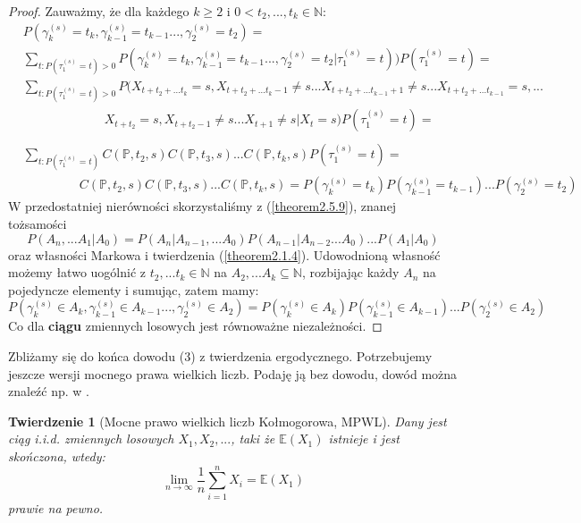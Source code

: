 \documentclass[a4paper]{article}
\theoremstyle{defn}
\theoremstyle{theorem}
\newtheorem{theorem}[defn]{Twierdzenie}
\theoremstyle{lemma}
\theoremstyle{cor}
\theoremstyle{fact}
\begin{document}
\begin{proof}
Zauważmy, że dla każdego $k \geq 2$ i $0 < t_2,...,t_k \in \mathbb{N}$:
\begin{align*}
    &P(\gamma_k^{(s)} = t_k, \gamma_{k-1}^{(s)} = t_{k-1} ..., \gamma_2^{(s)} = t_2) =\\
    &\sum\limits_{t: P(\tau_1^{(s)} = t) > 0} P(\gamma_k^{(s)} =t_k, \gamma_{k-1}^{(s)} = t_{k-1} ..., \gamma_2^{(s)} = t_2 | \tau_1^{(s)} = t))P(\tau_1^{(s)} = t) =\\
    &\sum\limits_{t: P(\tau_1^{(s)} = t) > 0} P(X_{t+t_2+...t_k} = s, X_{t+t_2+...t_k - 1} \neq s ... X_{t+t_2+...t_{k-1} + 1} \neq s ... X_{t+t_2+...t_{k-1}} = s, ...\\
    &\quad\quad\quad\quad\quad\quad\,\,\, X_{t+t_2} = s, X_{t+t_2 - 1} \neq s ... X_{t+1} \neq s|X_t = s)P(\tau_1^{(s)} = t) = \\\\
    &\sum\limits_{t: P(\tau_1^{(s)} = t)} C(\mathbb{P}, t_2, s)C(\mathbb{P}, t_3, s)...C(\mathbb{P}, t_k, s)P(\tau_1^{(s)} = t) =\\
    &\quad\quad\quad\quad\,\,\, C(\mathbb{P}, t_2, s)C(\mathbb{P}, t_3, s)...C(\mathbb{P}, t_k, s) = P(\gamma_k^{(s)} = t_k) P(\gamma_{k-1}^{(s)} = t_{k-1}) ...P(\gamma_2^{(s)} = t_2)
\end{align*}
W przedostatniej nierówności skorzystaliśmy z (\ref{theorem2.5.9}), znanej tożsamości
$$P(A_n, ... A_1|A_0) = P(A_n|A_{n-1}, ...A_0)P(A_{n-1}|A_{n-2}...A_0)...P(A_1|A_0)$$
oraz własności Markowa i twierdzenia (\ref{theorem2.1.4}). Udowodnioną własność możemy łatwo uogólnić z $t_2, ... t_k \in \mathbb{N}$ na $A_2, ... A_k \subseteq \mathbb{N}$, rozbijając każdy $A_n$ na pojedyncze elementy i sumując, zatem mamy:
$$P(\gamma_k^{(s)} \in A_k, \gamma_{k-1}^{(s)} \in A_{k-1} ..., \gamma_2^{(s)} \in A_2) = P(\gamma_k^{(s)} \in A_k) P(\gamma_{k-1}^{(s)} \in A_{k-1}) ...P(\gamma_2^{(s)} \in A_{2})$$
Co dla \textbf{ciągu} zmiennych losowych jest równoważne niezależności.
\end{proof}
Zbliżamy się do końca dowodu (3) z twierdzenia ergodycznego. Potrzebujemy jeszcze wersji mocnego prawa wielkich liczb. Podaję ją bez dowodu, dowód można znaleźć np. w \cite{sztencel}.
\begin{theorem}[Mocne prawo wielkich liczb Kołmogorowa, MPWL]\label{theorem2.5.10}
Dany jest ciąg i.i.d. zmiennych losowych $X_1, X_2, ... $, taki że $\mathbb{E}(X_1)$ istnieje i jest skończona, wtedy:
$$ \lim\limits_{n \to \infty} \frac{1}{n}\sum\limits_{i=1}^n X_i = \mathbb{E}(X_1)$$
prawie na pewno.
\end{theorem}
\end{document}
